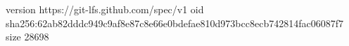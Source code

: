 version https://git-lfs.github.com/spec/v1
oid sha256:62ab82dddc949c9af8e87c8e66e0bdefae810d973bcc8ecb742814fac06087f7
size 28698
